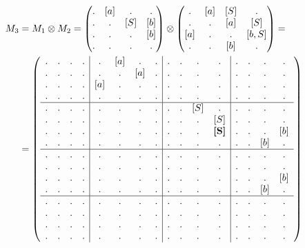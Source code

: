 \begin{example}
\begin{align}
M_3 &= M_1 \otimes M_2 = 
\begin{pmatrix} 
. & [a] & . & . \\
. & . & [S] & [b] \\
. & . & . & [b] \\
. & . & . & . 
\end{pmatrix}
\otimes 
\begin{pmatrix} 
. & [a] & [S] & . \\
. & . & [a] & [S] \\
[a] & . & . & [b,S] \\
. & . & [b] & . 
\end{pmatrix}
=\notag\\
&=
\left(\begin{array}{c c c c | c c c c | c c c c | c c c c } 
. & . & . & .  &  . & [a] & . & .  &  . & . & . & .    &  . & . & . & .   \\
. & . & . & .  &  . & . & [a] & .  &  . & . & . & .    &  . & . & . & .   \\
. & . & . & .  &  [a] & . & . & .  &  . & . & . & .    &  . & . & . & .   \\
. & . & . & .  &  . & . & . & .    &  . & . & . & .    &  . & . & . & .   \\
\hline
. & . & . & .  &  . & . & . & .    &  . & . & [S] & .             &  . & . & . & .   \\
. & . & . & .  &  . & . & . & .    &  . & . & .   & [S]           &  . & . & . & .   \\
. & . & . & .  &  . & . & . & .    &  . & . & .   & \textbf{[S]}  &  . & . & . & [b] \\
. & . & . & .  &  . & . & . & .    &  . & . & .   & .             &  . & . & [b] & . \\
\hline
. & . & . & .  &  . & . & . & .    &  . & . & . & .    &  . & . & . & .   \\
. & . & . & .  &  . & . & . & .    &  . & . & . & .    &  . & . & . & .   \\
. & . & . & .  &  . & . & . & .    &  . & . & . & .    &  . & . & . & [b] \\
. & . & . & .  &  . & . & . & .    &  . & . & . & .    &  . & . & [b] & . \\
\hline
. & . & . & .  &  . & . & . & .    &  . & . & . & .    &  . & . & . & .   \\
. & . & . & .  &  . & . & . & .    &  . & . & . & .    &  . & . & . & .   \\
. & . & . & .  &  . & . & . & .    &  . & . & . & .    &  . & . & . & .   \\
. & . & . & .  &  . & . & . & .    &  . & . & . & .    &  . & . & . & . 
\end{array}\right)
\end{align}


\end{example}

